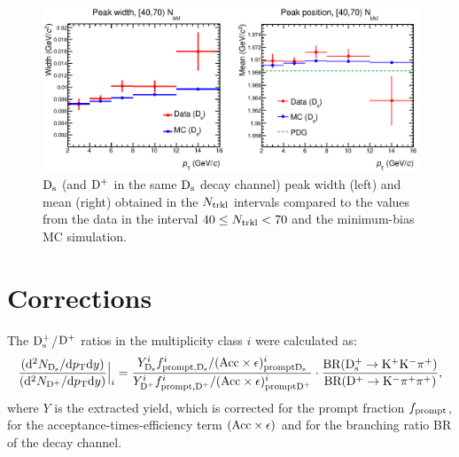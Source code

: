 \begin{figure}[htpb]
\centering
 \includegraphics[width=1\textwidth]{FigCap6/DsMeanSigma_DataMC_4070_Ntrkl.eps}
  \caption{${\rm D_s}$ (and ${\rm D^+}$ in the same ${\rm D_s}$ decay channel) peak width (left) and mean (right) obtained in the $N_{\rm trkl}$ intervals compared to the values from the data in the interval $40 \leq N_{\rm trkl} < 70$ and the minimum-bias MC simulation.}
 \label{fig:DsFitParamsVsNtrkl}
\end{figure}

\section{Corrections}
\label{sec:Corrections}
The ${\rm D_s^+}$/${\rm D^+}$ ratios in the multiplicity class $i$ were calculated
as:
\begin{equation} 
\label{eq:NtrklCorr}
 \frac{({\rm d}^2N_{{\rm D_s}}/{\rm d}p_{\rm T} {\rm d}y)}{({\rm d}^2N_{{\rm D^+}}/{\rm d}p_{\rm T} {\rm d}y)} \Big |_i = \frac{Y^i_{{\rm D_s}}  f^i_{\rm prompt, {\rm D_s}} / ({\rm Acc} \times \epsilon)^i_{\rm prompt {\rm D_s}}}{Y^i_{{\rm D^+}}  f^i_{\rm prompt, {\rm D^+}} / ({\rm Acc} \times \epsilon)^i_{\rm prompt {\rm D^+}}} \cdot \frac{\rm BR({\rm D^{+}_\mathrm{s}\to K^+ K^-\pi^+})}{\rm BR({\rm D}^+\to {\rm K}^-\pi^+\pi^+)},
\end{equation}
where $Y$ is the extracted yield, which is corrected for the prompt fraction
$f_{\rm prompt}$, for the acceptance-times-efficiency term $({\rm Acc} \times \epsilon)$ and for
the branching ratio BR of the decay channel.\\



